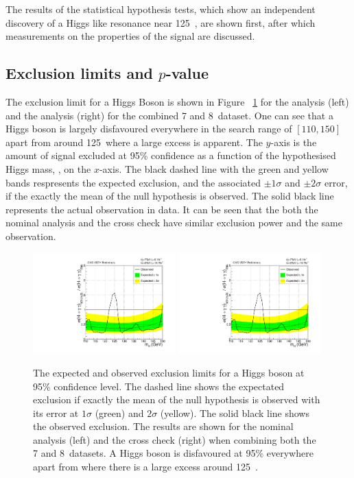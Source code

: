 The results of the statistical hypothesis tests, which show an independent discovery of a Higgs like resonance near 125~\GeV, are shown first, after which measurements on the properties of the signal are discussed.

\subsection{Exclusion limits and $p$-value}

The exclusion limit for a \SM Higgs Boson is shown in Figure ~\ref{fig:res_exclusion} for the \MFM analysis (left) and the \SMVA analysis (right) for the combined 7 and 8~\TeV dataset. One can see that a \SM Higgs boson is largely disfavoured everywhere in the search range of $[110,150]$ apart from around 125~\GeV where a large excess is apparent. The $y$-axis is the amount of \SM signal excluded at 95\% confidence as a function of the hypothesised Higgs mass, \mH, on the $x$-axis. The black dashed line with the green and yellow bands respresents the expected exclusion, and the associated $\pm1\sigma$ and $\pm2\sigma$ error, if the exactly the mean of the null hypothesis is observed. The solid black line represents the actual observation in data. It can be seen that the both the nominal \MFM analysis and the cross check \SMVA have similar exclusion power and the same observation.

\begin{figure}
  \includegraphics[width=0.49\textwidth]{ch5_anal_and_results/plots/results/obslimit.pdf}
  \includegraphics[width=0.49\textwidth]{ch5_anal_and_results/plots/results/obslimit_sideband.pdf}
  \caption{The expected and observed exclusion limits for a \SM Higgs boson at 95\% confidence level. The dashed line shows the expectated exclusion if exactly the mean of the null hypothesis is observed with its error at $1\sigma$ (green) and $2\sigma$ (yellow). The solid black line shows the observed exclusion. The results are shown for the nominal \MFM analysis (left) and the cross check \SMVA (right) when combining both the 7 and 8~\TeV datasets. A \SM Higgs boson is disfavoured at 95\% everywhere apart from where there is a large excess around 125~\GeV. \plotupdate}
  \label{fig:res_exclusion}
\end{figure}

